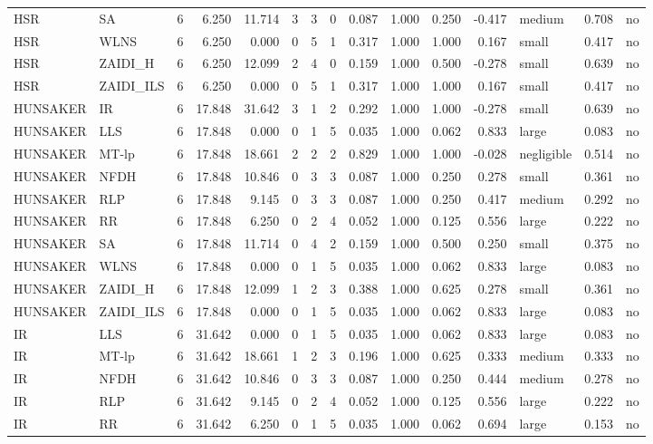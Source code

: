 \begin{table}[htbp]
\begin{tabular}{llrrrrrrrrrrlrr}
HSR & SA & 6 & 6.250 & 11.714 & 3 & 3 & 0 & 0.087 & 1.000 & 0.250 & -0.417 & medium & 0.708 & no \\
HSR & WLNS & 6 & 6.250 & 0.000 & 0 & 5 & 1 & 0.317 & 1.000 & 1.000 & 0.167 & small & 0.417 & no \\
HSR & ZAIDI\_H & 6 & 6.250 & 12.099 & 2 & 4 & 0 & 0.159 & 1.000 & 0.500 & -0.278 & small & 0.639 & no \\
HSR & ZAIDI\_ILS & 6 & 6.250 & 0.000 & 0 & 5 & 1 & 0.317 & 1.000 & 1.000 & 0.167 & small & 0.417 & no \\
HUNSAKER & IR & 6 & 17.848 & 31.642 & 3 & 1 & 2 & 0.292 & 1.000 & 1.000 & -0.278 & small & 0.639 & no \\
HUNSAKER & LLS & 6 & 17.848 & 0.000 & 0 & 1 & 5 & 0.035 & 1.000 & 0.062 & 0.833 & large & 0.083 & no \\
HUNSAKER & MT-lp & 6 & 17.848 & 18.661 & 2 & 2 & 2 & 0.829 & 1.000 & 1.000 & -0.028 & negligible & 0.514 & no \\
HUNSAKER & NFDH & 6 & 17.848 & 10.846 & 0 & 3 & 3 & 0.087 & 1.000 & 0.250 & 0.278 & small & 0.361 & no \\
HUNSAKER & RLP & 6 & 17.848 & 9.145 & 0 & 3 & 3 & 0.087 & 1.000 & 0.250 & 0.417 & medium & 0.292 & no \\
HUNSAKER & RR & 6 & 17.848 & 6.250 & 0 & 2 & 4 & 0.052 & 1.000 & 0.125 & 0.556 & large & 0.222 & no \\
HUNSAKER & SA & 6 & 17.848 & 11.714 & 0 & 4 & 2 & 0.159 & 1.000 & 0.500 & 0.250 & small & 0.375 & no \\
HUNSAKER & WLNS & 6 & 17.848 & 0.000 & 0 & 1 & 5 & 0.035 & 1.000 & 0.062 & 0.833 & large & 0.083 & no \\
HUNSAKER & ZAIDI\_H & 6 & 17.848 & 12.099 & 1 & 2 & 3 & 0.388 & 1.000 & 0.625 & 0.278 & small & 0.361 & no \\
HUNSAKER & ZAIDI\_ILS & 6 & 17.848 & 0.000 & 0 & 1 & 5 & 0.035 & 1.000 & 0.062 & 0.833 & large & 0.083 & no \\
IR & LLS & 6 & 31.642 & 0.000 & 0 & 1 & 5 & 0.035 & 1.000 & 0.062 & 0.833 & large & 0.083 & no \\
IR & MT-lp & 6 & 31.642 & 18.661 & 1 & 2 & 3 & 0.196 & 1.000 & 0.625 & 0.333 & medium & 0.333 & no \\
IR & NFDH & 6 & 31.642 & 10.846 & 0 & 3 & 3 & 0.087 & 1.000 & 0.250 & 0.444 & medium & 0.278 & no \\
IR & RLP & 6 & 31.642 & 9.145 & 0 & 2 & 4 & 0.052 & 1.000 & 0.125 & 0.556 & large & 0.222 & no \\
IR & RR & 6 & 31.642 & 6.250 & 0 & 1 & 5 & 0.035 & 1.000 & 0.062 & 0.694 & large & 0.153 & no \\

\end{tabular}
\end{table}
